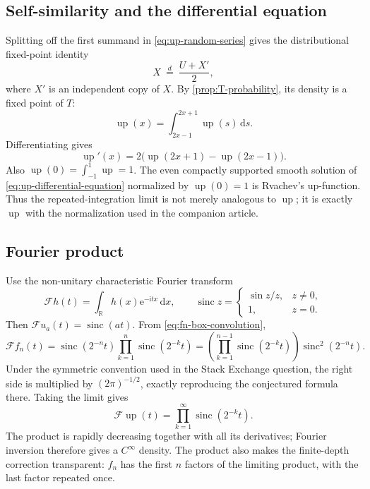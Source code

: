 \documentclass[11pt,oneside]{article}
\theoremstyle{definition}
\theoremstyle{remark}
\newcommand{\R}{\mathbb R}
\newcommand{\Up}{\operatorname{up}}
\newcommand{\sinc}{\operatorname{sinc}}
\newcommand{\dd}{\,\mathrm d}
\newcommand{\e}{\mathrm e}
\newcommand{\iu}{\mathrm i}
\begin{document}
\subsection{Self-similarity and the differential equation}

Splitting off the first summand in \eqref{eq:up-random-series} gives the distributional
fixed-point identity
\begin{equation}
 X\ \stackrel{d}{=}\ \frac{U+X'}2,
 \label{eq:up-fixed-point-random}
\end{equation}
where $X'$ is an independent copy of $X$.  By \cref{prop:T-probability}, its density is a
fixed point of $T$:
\begin{equation}
 \Up(x)=\int_{2x-1}^{2x+1}\Up(s)\dd s.
 \label{eq:up-fixed-point-integral}
\end{equation}
Differentiating gives
\begin{equation}
 \Up'(x)=2\bigl(\Up(2x+1)-\Up(2x-1)\bigr).
 \label{eq:up-differential-equation}
\end{equation}
Also $\Up(0)=\int_{-1}^{1}\Up=1$.  The even compactly supported smooth solution of
\eqref{eq:up-differential-equation} normalized by $\Up(0)=1$ is Rvachev's up-function.
Thus the repeated-integration limit is not merely analogous to $\Up$; it is exactly $\Up$
with the normalization used in the companion article.

\subsection{Fourier product}

Use the non-unitary characteristic Fourier transform
\begin{equation}
 \mathscr F h(t)=\int_{\R}h(x)\e^{-\iu tx}\dd x,
 \qquad \sinc z=\begin{cases}\sin z/z,&z\ne0,\\1,&z=0.\end{cases}
 \label{eq:fourier-convention}
\end{equation}
Then $\mathscr F u_a(t)=\sinc(at)$.  From \eqref{eq:fn-box-convolution},
\begin{equation}
 \mathscr F f_n(t)
 =\sinc(2^{-n}t)\prod_{k=1}^{n}\sinc(2^{-k}t)
 =\left(\prod_{k=1}^{n-1}\sinc(2^{-k}t)\right)\sinc^2(2^{-n}t).
 \label{eq:finite-fourier-product}
\end{equation}
Under the symmetric convention used in the Stack Exchange question, the right side is
multiplied by $(2\pi)^{-1/2}$, exactly reproducing the conjectured formula there.
Taking the limit gives
\begin{equation}
 \mathscr F\Up(t)=\prod_{k=1}^{\infty}\sinc(2^{-k}t).
 \label{eq:up-fourier-product}
\end{equation}
The product is rapidly decreasing together with all its derivatives; Fourier inversion
therefore gives a $C^\infty$ density.  The product also makes the finite-depth correction
transparent: $f_n$ has the first $n$ factors of the limiting product, with the last factor
repeated once.
\end{document}
